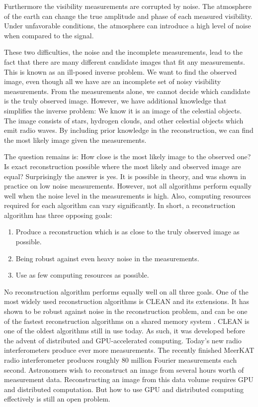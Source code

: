 Furthermore the visibility measurements are corrupted by noise. The atmosphere of the earth can change the true amplitude and phase of each measured visibility. Under unfavorable conditions, the atmosphere can introduce a high level of noise when compared to the signal.

These two difficulties, the noise and the incomplete measurements, lead to the fact that there are many different candidate images that fit any measurements.  This is known as an ill-posed inverse problem. We want to find the observed image, even though all we have are an incomplete set of noisy visibility measurements. From the measurements alone, we cannot decide which candidate is the truly observed image. However, we have additional knowledge that simplifies the inverse problem: We know it is an image of the celestial objects. The image consists of stars, hydrogen clouds, and other celestial objects which emit radio waves. By including prior knowledge in the reconstruction, we can find the most likely image given the measurements. 

The question remains is: How close is the most likely image to the observed one? Is exact reconstruction possible where the most likely and observed image are equal? Surprisingly the answer is yes. It is possible in theory\cite{candes2006robust,donoho2006compressed}, and was shown in practice on low noise measurements\cite{dabbech2018cygnus, dabbech2015moresane}. However, not all algorithms perform equally well when the noise level in the measurements is high. Also, computing resources required for each algorithm can vary significantly. In short, a reconstruction algorithm has three opposing goals:
\begin{enumerate}
	\item Produce a reconstruction which is as close to the truly observed image as possible.
	\item Being robust against even heavy noise in the measurements.
	\item Use as few computing resources as possible.
\end{enumerate}

No reconstruction algorithm performs equally well on all three goals. One of the most widely used reconstruction algorithms is CLEAN \cite{hogbom1974aperture, rau2011multi} and its extensions. It has shown to be robust against noise in the reconstruction problem, and can be one of the fastest reconstruction algorithms on a shared memory system \cite{offringa2017optimized}. CLEAN is one of the oldest algorithms still in use today. As such, it was developed before the advent of distributed and GPU-accelerated computing. Today's new radio interferometers produce ever more measurements. The recently finished MeerKAT radio interferometer produces roughly 80 million Fourier measurements each second. Astronomers wish to reconstruct an image from several hours worth of measurement data. Reconstructing an image from this data volume requires GPU and distributed computation. But how to use GPU and distributed computing effectively is still an open problem.

